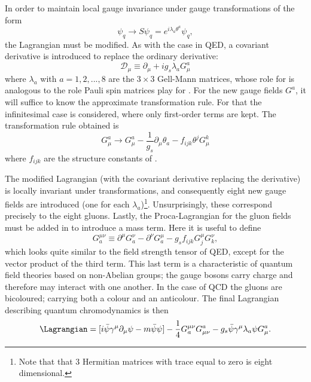 In order to maintain local gauge invariance under  gauge transformations of the form
\begin{equation}
    \psi_q\rightarrow S\psi_q=e^{i\lambda_a\theta^a}\psi_q,
\end{equation}
the Lagrangian must be modified. As with the case in QED, a covariant derivative is introduced to replace the ordinary derivative:
\begin{equation}
    \mathcal{D}_{\mu}\equiv\partial_{\mu}+ig_s\lambda_a{G^a_{\mu}}
\end{equation}
where $\lambda_a$ with $a=1,2,...,8$ are the $3\times3$ Gell-Mann matrices, whose role for  is analogous to the role Pauli spin matrices play for . For the new gauge fields $G^a$, it will suffice to know the approximate transformation rule. For that the infinitesimal case is considered, where only first-order terms are kept. The transformation rule obtained is
\begin{equation}
    G^a_{\mu}\rightarrow G^a_{\mu}-\dfrac{1}{g_s}\partial_{\mu}\theta_a-f_{ijk}\theta^jG_{\mu}^k
\end{equation}
where $f_{ijk}$ are the structure constants of . 

The modified Lagrangian (with the covariant derivative replacing the derivative) is locally invariant under  transformations, and consequently eight new gauge fields are introduced (one for each $\lambda_a$)\footnote{Note that that 3 Hermitian matrices with trace equal to zero is eight dimensional.}. Unsurprisingly, these correspond precisely to the eight gluons. Lastly, the Proca-Lagrangian for the gluon fields must be added in to introduce a mass term. Here it is useful to define
\begin{equation}
    G^{\mu\nu}_a \equiv \partial^{\mu}G_a^{\nu}-\partial^{\nu}G_a^{\mu}-g_sf_{ijk}G^{\mu}_jG^{\nu}_k,
\end{equation}
which looks quite similar to the field strength tensor of QED, except for the vector product of the third term. This last term is a characteristic of quantum field theories based on non-Abelian groups; the gauge bosons carry charge and therefore may interact with one another. In the case of QCD the gluons are bicoloured; carrying both a colour and an anticolour. The final Lagrangian describing quantum chromodynamics is then
\begin{equation}
    \Lagrangian=[i\bar{\psi}\gamma^{\mu}\partial_{\mu}\psi-m\bar{\psi}\psi] - \dfrac{1}{4}G^{\mu\nu}_aG^a_{\mu\nu}-g_s\bar{\psi}\gamma^{\mu}\lambda_a \psi G_{\mu}^a.
\end{equation}

